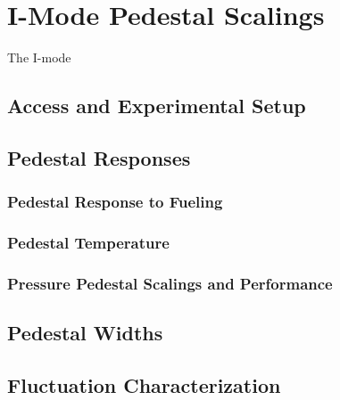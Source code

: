 \chapter{I-Mode Pedestal Scalings}\label{ch:ImodePedestal}

The I-mode \cite{Whyte2010,Hubbard2011}

\section{Access and Experimental Setup}\label{sec:imode_setup}

\nicesectionending

\section{Pedestal Responses}\label{sec:imode_height}

\subsection{Pedestal Response to Fueling}\label{subsec:imode_fueling}

\begin{figure}
 \pushtooutside
\end{figure}

\subsection{Pedestal Temperature}\label{subsec:imode_temp}

\subsection{Pressure Pedestal Scalings and Performance}\label{subsec:imode_pres}

\nicesectionending

\section{Pedestal Widths}\label{sec:imode_width}

\nicesectionending

\section{Fluctuation Characterization}\label{sec:imode_fluct}

\nicechapterending


